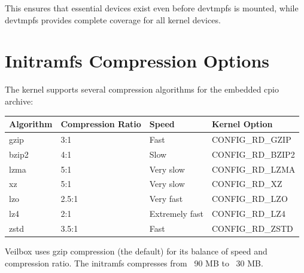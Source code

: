 This ensures that essential devices exist even before devtmpfs is mounted,
while devtmpfs provides complete coverage for all kernel devices.

\section{Initramfs Compression Options}

The kernel supports several compression algorithms for the embedded cpio
archive:

\begin{longtable}{|p{3cm}|p{3cm}|p{3cm}|p{3cm}|}
\hline
\textbf{Algorithm} & \textbf{Compression Ratio} & \textbf{Speed} & \textbf{Kernel Option} \\
\hline
gzip & 3:1 & Fast & CONFIG\_RD\_GZIP \\
bzip2 & 4:1 & Slow & CONFIG\_RD\_BZIP2 \\
lzma & 5:1 & Very slow & CONFIG\_RD\_LZMA \\
xz & 5:1 & Very slow & CONFIG\_RD\_XZ \\
lzo & 2.5:1 & Very fast & CONFIG\_RD\_LZO \\
lz4 & 2:1 & Extremely fast & CONFIG\_RD\_LZ4 \\
zstd & 3.5:1 & Fast & CONFIG\_RD\_ZSTD \\
\hline
\end{longtable}

Veilbox uses gzip compression (the default) for its balance of speed and
compression ratio. The initramfs compresses from ~90 MB to ~30 MB.
